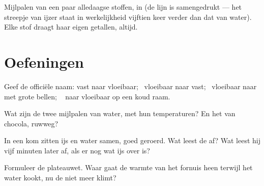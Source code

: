 \begin{omfigure}

{\small Mijlpalen van een paar alledaagse stoffen, in
 (de lijn is samengedrukt --- het streepje van ijzer
staat in werkelijkheid vijftien keer verder dan dat van water). Elke
stof draagt haar eigen getallen, altijd.}
\end{omfigure}

\section{Oefeningen}

\begin{exercise}[$\star$]\label{exo:g4:changes-of-state:1}
Geef de officiële naam: vast naar vloeibaar; \ vloeibaar naar
vast; \ vloeibaar naar  met grote bellen; \  naar
vloeibaar op een koud raam.
\end{exercise}

\begin{exercise}[$\star$]\label{exo:g4:changes-of-state:2}
Wat zijn de twee mijlpalen van water, met hun temperaturen? En het
 van chocola, ruwweg?
\end{exercise}

\begin{exercise}[$\star$]\label{exo:g4:changes-of-state:3}
In een kom zitten ijs en water samen, goed geroerd. Wat leest de
 af? Wat leest hij vijf minuten later af, als er nog wat
ijs over is?
\end{exercise}

\begin{exercise}[$\star$]\label{exo:g4:changes-of-state:4}
Formuleer de plateauwet. Waar gaat de warmte van het fornuis heen
terwijl het water kookt, nu de  niet meer klimt?
\end{exercise}

